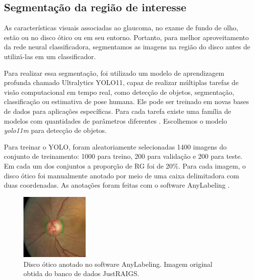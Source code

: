 \documentclass[12pt]{article}
\begin{document}



\subsection{Segmentação da região de interesse}
\label{sec:segmentation}

As características visuais associadas ao glaucoma, no exame de fundo de olho, estão ou no disco ótico ou em seu entorno. Portanto, para melhor aproveitamento da rede neural classificadora, segmentamos as imagens na região do disco antes de utilizá-las em um classificador.

Para realizar essa segmentação, foi utilizado um modelo de aprendizagem profunda chamado Ultralytics YOLO11, capaz de realizar múltiplas tarefas de visão computacional em tempo real, como detecção de objetos, segmentação, classificação ou estimativa de pose humana. Ele pode ser treinado em novas bases de dados para aplicações específicas. Para cada tarefa existe uma família de modelos com quantidades de parâmetros diferentes \cite{YOLO_2023}. Escolhemos o modelo \emph{yolo11m} para detecção de objetos.

Para treinar o YOLO, foram aleatoriamente selecionadas 1400 imagens do conjunto de treinamento: 1000 para treino, 200 para validação e 200 para teste. Em cada um dos conjuntos a proporção de RG foi de 20\%. Para cada imagem, o disco ótico foi manualmente anotado por meio de uma caixa delimitadora com duas coordenadas. As anotações foram feitas com o software AnyLabeling \cite{anylabeling}.

\begin{figure}[htb]
 \centering
 \includegraphics[width=0.3\textwidth]{images/disk_labeling.png}
 \caption{Disco ótico anotado no software AnyLabeling. Imagem original obtida do banco de dados JustRAIGS.}
 \label{fig:disk_labeling}
\end{figure}
\end{document}
